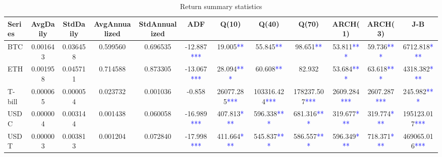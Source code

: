 \begin{table}[H]
\caption{Return summary statistics}
\label{tab:return_summary_statistics}
\centering
\normalsize
\begin{adjustbox}{max width=\textwidth}
\begin{tabular}{@{}lccccccccccc@{}}
\toprule
Series & AvgDaily & StdDaily & AvgAnnualized & StdAnnualized & ADF & Q(10) & Q(40) & Q(70) & ARCH(1) & ARCH(3) & J-B \\
\midrule
\gls{BTC} & 0.001643 & 0.036458 & 0.599560 & 0.696535 & -12.887\textcolor{blue}{***} & 19.005\textcolor{blue}{**} & 55.845\textcolor{blue}{**} & 98.651\textcolor{blue}{**} & 53.811\textcolor{blue}{***} & 59.736\textcolor{blue}{***} & 6712.818\textcolor{blue}{***} \\
\gls{ETH} & 0.001958 & 0.045711 & 0.714588 & 0.873305 & -13.067\textcolor{blue}{***} & 28.094\textcolor{blue}{***} & 60.608\textcolor{blue}{**} & 82.932 & 53.684\textcolor{blue}{***} & 63.618\textcolor{blue}{***} & 4318.382\textcolor{blue}{***} \\
\gls{T-bill} & 0.000065 & 0.000054 & 0.023732 & 0.001036 & -0.858 & 26077.285\textcolor{blue}{***} & 103316.424\textcolor{blue}{***} & 178237.507\textcolor{blue}{***} & 2609.284\textcolor{blue}{***} & 2607.287\textcolor{blue}{***} & 245.982\textcolor{blue}{***} \\
\gls{USDC} & 0.000004 & 0.003144 & 0.001438 & 0.060058 & -16.989\textcolor{blue}{***} & 407.813\textcolor{blue}{***} & 596.338\textcolor{blue}{***} & 681.316\textcolor{blue}{***} & 319.677\textcolor{blue}{***} & 319.774\textcolor{blue}{***} & 195123.017\textcolor{blue}{***} \\
\gls{USDT} & 0.000003 & 0.003813 & 0.001204 & 0.072840 & -17.998\textcolor{blue}{***} & 411.664\textcolor{blue}{***} & 545.837\textcolor{blue}{***} & 586.557\textcolor{blue}{***} & 596.349\textcolor{blue}{***} & 718.371\textcolor{blue}{***} & 469065.016\textcolor{blue}{***} \\
\bottomrule
\end{tabular}
\end{adjustbox}
\end{table}
